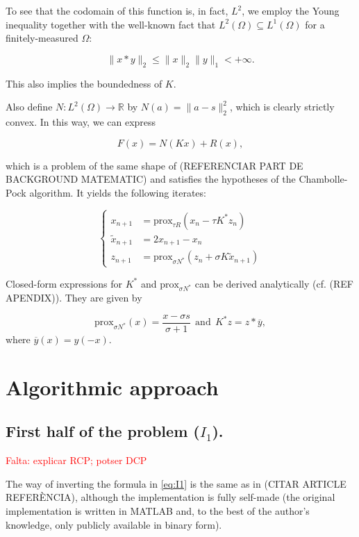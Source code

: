 \documentclass[twocolumn,twoside,a4paper,10pt]{IEEEtran}
\newcommand{\Frank}[1]{\textcolor{red}{#1}}
\begin{document}
To see that the codomain of this function is, in fact, \(L^2\), we employ the Young inequality together with the well-known fact that \(L^2(\Omega)\subseteq L^1(\Omega)\) for a finitely-measured \(\Omega\):

\[
  \|x\ast y\|_2 \leq \|x\|_{2}\|y\|_{1} < +\infty
.\]

This also implies the boundedness of \(K\).

Also define \(N\colon L^2(\Omega)\to \mathbb{R}\) by \(N(a) = \|a - s\|_{2}^2\), which is clearly strictly convex. In this way, we can express

\[
  F(x) = N(Kx) + R(x),
\]

which is a problem of the same shape of (REFERENCIAR PART DE BACKGROUND MATEMATIC) and satisfies the hypotheses of the Chambolle-Pock algorithm. It yields the following iterates:

\begin{equation}\label{eq:iterates}
  \left\{
  \begin{split}
    x_{n+1} & = \text{prox}_{\tau R}(x_n - \tau K^*z_n) \\
    \tilde{x}_{n+1} & = 2x_{n+1} - x_n \\
    z_{n+1} & = \text{prox}_{\sigma N^*}(z_n + \sigma K\tilde{x}_{n+1})
  \end{split}
  \right.
\end{equation}

Closed-form expressions for \(K^*\) and \(\text{prox}_{\sigma N^*}\) can be derived analytically (cf. (REF APENDIX)). They are given by

\begin{equation}\label{eq:primal-dual-analytical}
  \text{prox}_{\sigma N^*}(x) = \frac{x-\sigma s}{\sigma + 1} ~~ \text{and} ~~ K^*z = z\ast \overline{y},
\end{equation}
where \(\overline{y}(x) = y(-x)\).


\section{Algorithmic approach}
\subsection{First half of the problem (\(I_1\)).}
\Frank{Falta: explicar RCP; potser DCP}

The way of inverting the formula in \cref{eq:I1} is the same as in (CITAR ARTICLE REFERÈNCIA), although the implementation is fully self-made (the original implementation is written in MATLAB and, to the best of the author's knowledge, only publicly available in binary form).
\end{document}
